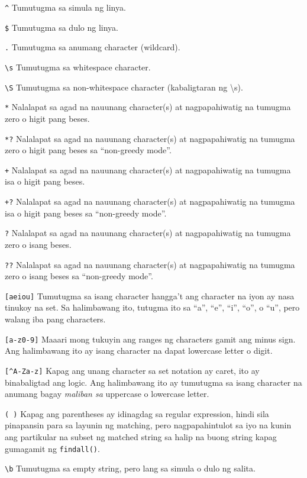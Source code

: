 \documentclass[10pt,]{book}
\begin{document}
\texttt{\^{}} Tumutugma sa simula ng linya.

\texttt{\$} Tumutugma sa dulo ng linya.

\texttt{.} Tumutugma sa anumang character (wildcard).

\texttt{\textbackslash{}s} Tumutugma sa whitespace character.

\texttt{\textbackslash{}S} Tumutugma sa non-whitespace character
(kabaligtaran ng \textbackslash s).

\texttt{*} Nalalapat sa agad na nauunang character(s) at nagpapahiwatig
na tumugma zero o higit pang beses.

\texttt{*?} Nalalapat sa agad na nauunang character(s) at nagpapahiwatig
na tumugma zero o higit pang beses sa ``non-greedy mode''.

\texttt{+} Nalalapat sa agad na nauunang character(s) at nagpapahiwatig
na tumugma isa o higit pang beses.

\texttt{+?} Nalalapat sa agad na nauunang character(s) at nagpapahiwatig
na tumugma isa o higit pang beses sa ``non-greedy mode''.

\texttt{?} Nalalapat sa agad na nauunang character(s) at nagpapahiwatig
na tumugma zero o isang beses.

\texttt{??} Nalalapat sa agad na nauunang character(s) at nagpapahiwatig
na tumugma zero o isang beses sa ``non-greedy mode''.

\texttt{{[}aeiou{]}} Tumutugma sa isang character hangga't ang character
na iyon ay nasa tinukoy na set. Sa halimbawang ito, tutugma ito sa
``a'', ``e'', ``i'', ``o'', o ``u'', pero walang iba pang characters.

\texttt{{[}a-z0-9{]}} Maaari mong tukuyin ang ranges ng characters gamit
ang minus sign. Ang halimbawang ito ay isang character na dapat
lowercase letter o digit.

\texttt{{[}\^{}A-Za-z{]}} Kapag ang unang character sa set notation ay
caret, ito ay binabaligtad ang logic. Ang halimbawang ito ay tumutugma
sa isang character na anumang bagay \emph{maliban sa} uppercase o
lowercase letter.

\texttt{(\ )} Kapag ang parentheses ay idinagdag sa regular expression,
hindi sila pinapansin para sa layunin ng matching, pero nagpapahintulot
sa iyo na kunin ang partikular na subset ng matched string sa halip na
buong string kapag gumagamit ng \texttt{findall()}.

\texttt{\textbackslash{}b} Tumutugma sa empty string, pero lang sa
simula o dulo ng salita.
\end{document}
